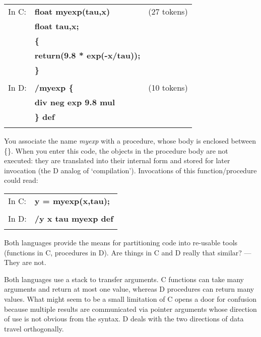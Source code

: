 \begin{tabular}{>{\normalfont}l>{\sffamily\bfseries}l>{\normalfont}r}

In C: & float myexp(tau,x) & (27 tokens)\\
      & float tau,x;\\
      & \{\\
      & return(9.8 * exp(-x/tau));\\
      & \}\\\\
In D: & /myexp \{ & (10 tokens)\\
      & div neg exp 9.8 mul\\
      & \} def\\\\
\end{tabular}

\noindent You associate the name \emph{myexp} with a procedure,  whose body is  enclosed between \{\}.  When you enter this code,  the objects in the procedure body are not executed: they are translated into their internal form and stored for later invocation (the D analog of `compilation'). Invocations of this function/procedure could read:\\

\begin{tabular}{>{\normalfont}l>{\sffamily\bfseries}l}
In C: & y = myexp(x,tau);\\\\
In D: & /y x tau myexp def\\\\
\end{tabular}

\noindent Both  languages provide the means for partitioning code  into  re-usable tools  (functions in C,  procedures in D).  Are things in C and D really that similar? --- They are not.

Both languages use a stack to  transfer arguments.  C  functions can take many arguments and return at  most  one value,  whereas  D procedures can return many values. What might seem to be a small limitation of C opens a door for confusion because multiple results are communicated via pointer arguments whose direction of use is not obvious from the syntax. D deals with the two directions of data travel orthogonally.


